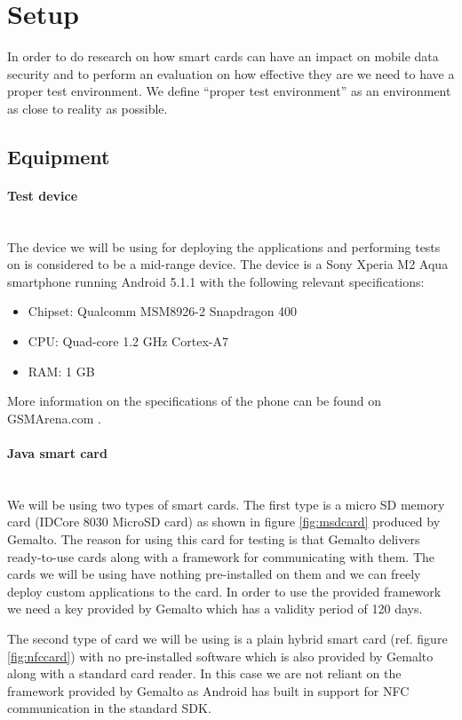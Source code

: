 \section{Setup}
In order to do research on how smart cards can have an impact on mobile data security and to perform an evaluation on how effective they are we need to have a proper test environment. We define ``proper test environment'' as an environment as close to reality as possible.
\subsection{Equipment}
\label{sec:equipment}

\paragraph{Test device}\mbox{}\\
The device we will be using for deploying the applications and performing tests on is considered to be a mid-range device. The device is a Sony Xperia M2 Aqua smartphone running Android 5.1.1 with the following relevant specifications:
\begin{itemize}
    \item Chipset: Qualcomm MSM8926-2 Snapdragon 400
    \item CPU: Quad-core 1.2 GHz Cortex-A7
    \item RAM: 1 GB
\end{itemize}
More information on the specifications of the phone can be found on  \newline
GSMArena.com \cite{sonym2}.

\paragraph{Java smart card}\mbox{}\\
We will be using two types of smart cards. The first type is a micro SD memory card (IDCore 8030 MicroSD card) as shown in figure \ref{fig:msdcard} produced by Gemalto. The reason for using this card for testing is that Gemalto delivers ready-to-use cards along with a framework for communicating with them. The cards we will be using have nothing pre-installed on them and we can freely deploy custom applications to the card. In order to use the provided framework we need a key provided by Gemalto which has a validity period of 120 days.

The second type of card we will be using is a plain hybrid smart card (ref. figure \ref{fig:nfccard}) with no pre-installed software which is also provided by Gemalto along with a standard card reader. In this case we are not reliant on the framework provided by Gemalto as Android has built in support for NFC communication in the standard SDK.

